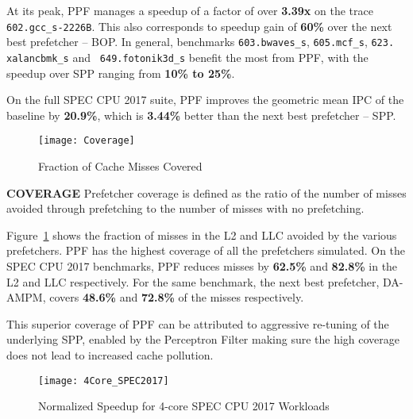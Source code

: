 At its peak, PPF manages a speedup of a factor of over \textbf{3.39x} on the
trace {\tt 602.gcc\_s-2226B}.  This also corresponds to speedup gain of
\textbf{60\%} over the next best prefetcher -- BOP.  In general, benchmarks
{\tt 603.bwaves\_s}, {\tt 605.mcf\_s}, {\tt 623. xalancbmk\_s} and {\tt
649.fotonik3d\_s} benefit the most from PPF, with the speedup over SPP ranging
from \textbf{10\% to 25\%}.

On the full SPEC CPU 2017 suite, PPF improves the geometric mean IPC of 
the baseline by \textbf{20.9\%}, which is \textbf{3.44\%} better 
than the next best prefetcher -- SPP.
\newline

\begin{figure}[h]
\texttt{[image: Coverage]}
\caption{Fraction of Cache Misses Covered}
\label{Fig:Coverage}
\end{figure}


\noindent \textbf{COVERAGE}
\newline
Prefetcher coverage is defined as the ratio of the number of misses avoided
through prefetching to the number of misses with no prefetching.

Figure~\ref{Fig:Coverage} shows the fraction of misses in the L2 and LLC
avoided by the various prefetchers.  PPF has the highest coverage of all the
prefetchers simulated. On the SPEC CPU 2017 benchmarks, PPF reduces misses by
\textbf{62.5\%} and \textbf{82.8\%} in the L2 and LLC respectively. For the
same benchmark, the next best prefetcher, DA-AMPM, covers \textbf{48.6\%} and
\textbf{72.8\%} of the misses respectively.

This superior coverage of PPF can be attributed to aggressive re-tuning of the
underlying SPP, enabled by the Perceptron Filter making sure the high coverage
does not lead to increased cache pollution.

\begin{figure*}[ht]
\texttt{[image: 4Core\_SPEC2017]}
\caption{Normalized Speedup for 4-core SPEC CPU 2017 Workloads}
\label{Fig:4Core_SPEC2017}
\end{figure*}

